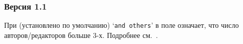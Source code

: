 \documentclass[10pt,a4paper,headings=small,numbers=enddot,english,russian]{ltxdockit}
\newcommand*{\biber}{Biber\xspace}
\newcommand*{\biblatex}{Biblatex\xspace}
\begin{document}
\subsubsection*{Версия 1.1}

\begin{trivlist}
\item При  (установлено по умолчанию) `\texttt{and others}' 
  в поле 
  означает, что число авторов/редакторов больше 3-х. Подробнее см.~.
\end{trivlist}



% 
\end{document}
